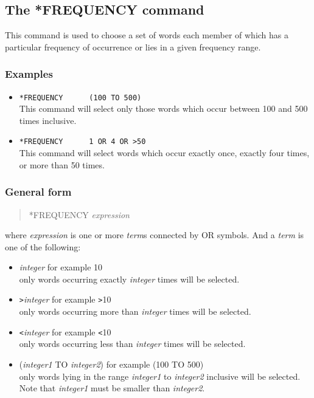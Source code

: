 \subsection{The *FREQUENCY command}
\label{freq}
This command is used to choose a set of words each member of which
has a particular frequency of occurrence or lies in a given frequency
range.

\subsubsection{Examples}
\begin{itemize}
\item  \verb/*FREQUENCY      (100 TO 500)/\\
      This command will select only those words which occur between 100
      and 500 times inclusive.
\item  \verb/*FREQUENCY      1 OR 4 OR >50/\\
      This command will select words which occur exactly once, exactly
      four times, or more than 50 times.
\end{itemize}

\subsubsection{General form}
\begin{quote}
*FREQUENCY         {\em expression}
\end{quote}
where {\em expression} is one or more {\em term}s connected by OR symbols.
And a {\em term} is one of the following:

\begin{itemize}
\item  {\em integer}                 for example 10\\
    only words occurring exactly {\em integer} times will be selected.
\item \verb/>/{\em integer}                 for example \verb/>/10\\
    only words occurring more than {\em integer} times will be selected.
\item \verb/</{\em integer}                 for example \verb/</10\\
    only words occurring less than {\em integer} times will be selected.
\item ({\em integer1} TO {\em integer2})  for example (100 TO 500)\\
    only words lying in the range {\em integer1} to {\em integer2} inclusive
    will be selected. Note that {\em integer1} must be smaller than
    {\em integer2}.
\end{itemize}

